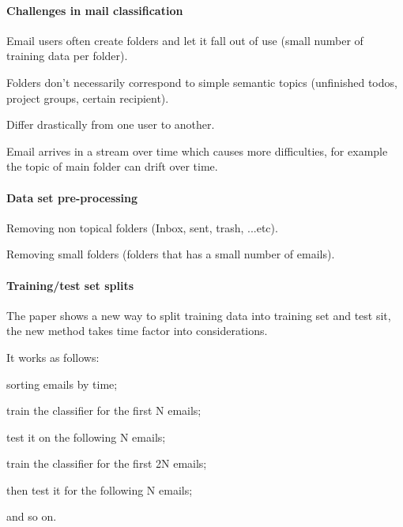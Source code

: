 \documentclass[12pt]{article}
\newenvironment{my_itemize}
{\begin{itemize}
  \setlength{\itemsep}{0cm}
  \setlength{\parskip}{0cm}}
{\end{itemize}}
\begin{document}
\paragraph{Challenges in mail classification}
\begin{my_itemize}
  \item Email users often create folders and let it fall out of use 
	(small number of training data per folder).
  \item Folders don’t necessarily correspond to simple semantic topics 
	(unfinished todos, project groups, certain recipient).
  \item Differ drastically from one user to another.
  \item Email arrives in a stream over time which causes more difficulties, 
	for example the topic of main folder can drift over time.
\end{my_itemize}


\paragraph{Data set pre-processing}
\begin{my_itemize}
    \item Removing non topical folders (Inbox, sent, trash, ...etc).
    \item Removing small folders (folders that has a small number of emails).
\end{my_itemize}

\paragraph{Training/test set splits}
\begin{my_itemize}
    \item The paper shows a new way to split training data into training set 
	  and test sit, the new method takes time factor into considerations.
    \item It works as follows:
    \begin{my_itemize}
        \item sorting emails by time;
        \item train the classifier for the first N emails;
        \item test it on the following N emails;
        \item train the classifier for the first 2N emails;
        \item then test it for the following N emails;
        \item and so on.
    \end{my_itemize}
\end{my_itemize}
\end{document}
